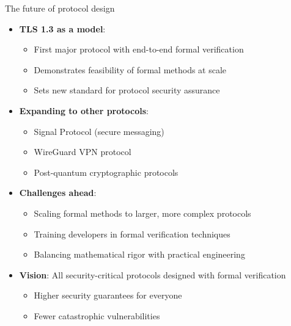 \documentclass[aspectratio=169, lualatex, handout]{beamer}
\begin{document}
\begin{frame}{The future of protocol design}
	\begin{itemize}
		\item \textbf{TLS 1.3 as a model}:
		      \begin{itemize}
			      \item First major protocol with end-to-end formal verification
			      \item Demonstrates feasibility of formal methods at scale
			      \item Sets new standard for protocol security assurance
		      \end{itemize}
		\item \textbf{Expanding to other protocols}:
		      \begin{itemize}
			      \item Signal Protocol (secure messaging)
			      \item WireGuard VPN protocol
			      \item Post-quantum cryptographic protocols
		      \end{itemize}
		\item \textbf{Challenges ahead}:
		      \begin{itemize}
			      \item Scaling formal methods to larger, more complex protocols
			      \item Training developers in formal verification techniques
			      \item Balancing mathematical rigor with practical engineering
		      \end{itemize}
		\item \textbf{Vision}: All security-critical protocols designed with formal verification
		      \begin{itemize}
			      \item Higher security guarantees for everyone
			      \item Fewer catastrophic vulnerabilities
		      \end{itemize}
	\end{itemize}
\end{frame}

\begin{frame}[plain]
	\titlepage
\end{frame}
\end{document}
